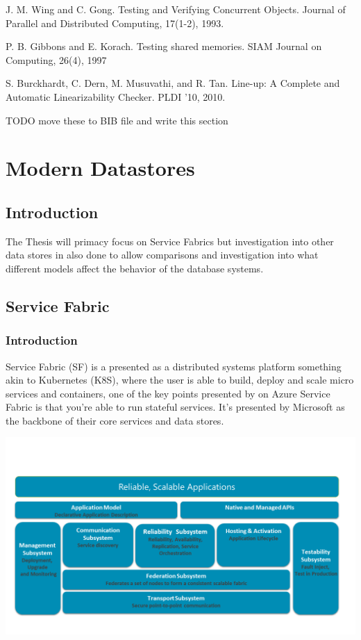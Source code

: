 \documentclass[a4paper,10pt,titlepage]{report}
\begin{document}
J. M. Wing and C. Gong. Testing and Verifying
Concurrent Objects. Journal of Parallel and
Distributed Computing, 17(1-2), 1993.

P. B. Gibbons and E. Korach. Testing shared
memories. SIAM Journal on Computing, 26(4), 1997

S. Burckhardt, C. Dern, M. Musuvathi, and R. Tan.
Line-up: A Complete and Automatic Linearizability
Checker. PLDI ’10, 2010.


TODO move these to BIB file and write this section





\newpage
\chapter{Modern Datastores}

\section{Introduction}

The Thesis will primacy focus on Service Fabrics but investigation into other data stores in also done to allow comparisons and investigation into what different models affect the behavior of the database systems.

\section{Service Fabric}
\subsection{Introduction}

Service Fabric (SF) is a presented as a distributed systems platform something akin to Kubernetes (K8S), where the user is able to build, deploy and scale micro services and containers, one of the key points presented by on Azure Service Fabric is that you're able to run stateful services. It's presented by Microsoft as the backbone of their core services and data stores.\\
\vspace{5mm}

\includegraphics[scale=0.5]{images/service-fabric-architecture.png}
\end{document}
